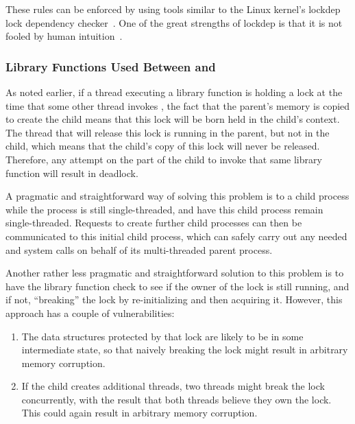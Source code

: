 These rules can be enforced by using tools similar to
the Linux kernel's lockdep lock dependency
checker~\cite{JonathanCorbet2006lockdep}.
One of the great strengths of lockdep is that it is not fooled by
human intuition~\cite{StevenRostedt2011locdepCryptic}.

\subsubsection{Library Functions Used Between  and }
\label{sec:locking:Library Functions Used Between fork() and exec()}

As noted earlier, if a thread executing a library function is holding
a lock at the time that some other thread invokes , the
fact that the parent's memory is copied to create the child means that
this lock will be born held in the child's context.
The thread that will release this lock is running in the parent, but not
in the child, which means that the child's copy of this lock will never
be released.
Therefore, any attempt on the part of the child to invoke that same
library function will result in deadlock.

A pragmatic and straightforward way of solving this problem is
to  a child process while the process is still single-threaded,
and have this child process remain single-threaded.
Requests to create further child processes can then be communicated
to this initial child process, which can safely carry out any
needed  and  system calls on behalf of its
multi-threaded parent process.

Another rather less pragmatic and straightforward solution to this problem
is to have the library function check to see if the owner of the lock
is still running, and if not, ``breaking'' the lock by re-initializing
and then acquiring it.
However, this approach has a couple of vulnerabilities:

\begin{enumerate}
\item	The data structures protected by that lock are likely to
	be in some intermediate state, so that naively breaking the lock
	might result in arbitrary memory corruption.
\item	If the child creates additional threads, two threads might
	break the lock concurrently, with the result that both
	threads believe they own the lock.
	This could again result in arbitrary memory corruption.
\end{enumerate}

